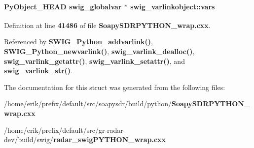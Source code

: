 \paragraph[{vars}]{\setlength{\rightskip}{0pt plus 5cm}Py\+Object\+\_\+\+H\+E\+AD {\bf swig\+\_\+globalvar} $\ast$ swig\+\_\+varlinkobject\+::vars}\label{structswig__varlinkobject_a7c03e9f19969e73923a456aefd82ff05}


Definition at line {\bf 41486} of file {\bf Soapy\+S\+D\+R\+P\+Y\+T\+H\+O\+N\+\_\+wrap.\+cxx}.



Referenced by {\bf S\+W\+I\+G\+\_\+\+Python\+\_\+addvarlink()}, {\bf S\+W\+I\+G\+\_\+\+Python\+\_\+newvarlink()}, {\bf swig\+\_\+varlink\+\_\+dealloc()}, {\bf swig\+\_\+varlink\+\_\+getattr()}, {\bf swig\+\_\+varlink\+\_\+setattr()}, and {\bf swig\+\_\+varlink\+\_\+str()}.



The documentation for this struct was generated from the following files\+:\begin{DoxyCompactItemize}
\item 
/home/erik/prefix/default/src/soapysdr/build/python/{\bf Soapy\+S\+D\+R\+P\+Y\+T\+H\+O\+N\+\_\+wrap.\+cxx}\item 
/home/erik/prefix/default/src/gr-\/radar-\/dev/build/swig/{\bf radar\+\_\+swig\+P\+Y\+T\+H\+O\+N\+\_\+wrap.\+cxx}\end{DoxyCompactItemize}
